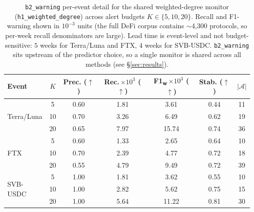 \begin{table}[!htbp]
\centering
\footnotesize
\setlength{\tabcolsep}{4pt}
\caption{\texttt{b2\_warning} per-event detail for the shared weighted-degree
monitor (\texttt{h1\_weighted\_degree}) across alert budgets $K\in\{5,10,20\}$.
Recall and F1-warning shown in $10^{-3}$ units (the full DeFi corpus contains
$\sim$4{,}300 protocols, so per-week recall denominators are large). Lead
time is event-level and not budget-sensitive: $5$ weeks for Terra/Luna and
FTX, $4$ weeks for SVB-USDC. \texttt{b2\_warning} sits upstream of the
predictor choice, so a single monitor is shared across all methods
(see \S\ref{sec:results}).}
\label{tab:b2_budget}
\begin{tabular}{l c c c c c c}
\toprule
Event & $K$ & Prec. ($\uparrow$) & Rec.\,$\times 10^{3}$ ($\uparrow$) & F1\textsubscript{w}\,$\times 10^{3}$ ($\uparrow$) & Stab. ($\uparrow$) & $|\mathcal{A}|$ \\
\midrule
\multirow{3}{*}{Terra/Luna}
& 5  & 0.60 & 1.81 & 3.61 & 0.44 & 11 \\
& 10 & 0.70 & 3.26 & 6.49 & 0.62 & 19 \\
& 20 & 0.65 & 7.97 & 15.74 & 0.74 & 36 \\
\midrule
\multirow{3}{*}{FTX}
& 5  & 0.60 & 1.33 & 2.65 & 0.64 & 10 \\
& 10 & 0.70 & 2.39 & 4.77 & 0.72 & 18 \\
& 20 & 0.55 & 4.79 & 9.49 & 0.72 & 39 \\
\midrule
\multirow{3}{*}{SVB-USDC}
& 5  & 1.00 & 1.81 & 3.62 & 0.55 & 10 \\
& 10 & 1.00 & 2.82 & 5.62 & 0.75 & 15 \\
& 20 & 1.00 & 5.64 & 11.22 & 0.81 & 30 \\
\bottomrule
\end{tabular}
\end{table}
